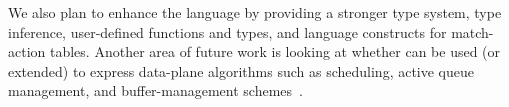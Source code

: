 We also plan to enhance the \pktlanguage language by providing a stronger type
system, type inference, user-defined functions and types, and language
constructs for match-action tables. Another area of future work is looking at
whether \pktlanguage can be used (or extended) to express data-plane algorithms
such as scheduling, active queue management, and buffer-management
schemes~\cite{broadcom_buffer}.
